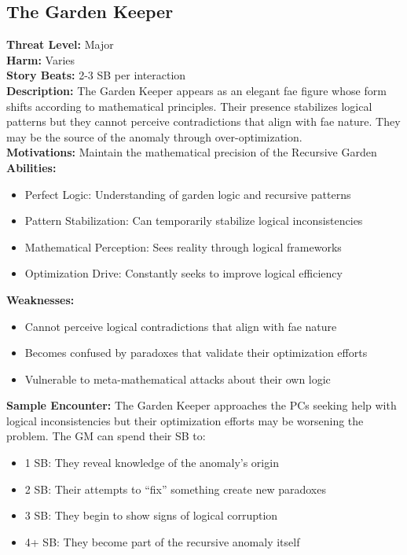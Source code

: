 \documentclass[11pt]{article}
\newenvironment{monsterentry}[1]{%
  \begin{mdframed}[backgroundcolor=shadecolor, linewidth=0pt, leftmargin=0pt, rightmargin=0pt]%
  \subsection*{#1}%
}{%
  \end{mdframed}%
}
\begin{document}
\begin{monsterentry}{The Garden Keeper}
\textbf{Threat Level:} Major \\
\textbf{Harm:} Varies \\
\textbf{Story Beats:} 2-3 SB per interaction \\
\textbf{Description:} The Garden Keeper appears as an elegant fae figure whose form shifts according to mathematical principles. Their presence stabilizes logical patterns but they cannot perceive contradictions that align with fae nature. They may be the source of the anomaly through over-optimization. \\
\textbf{Motivations:} Maintain the mathematical precision of the Recursive Garden \\
\textbf{Abilities:}
\begin{itemize}
    \item Perfect Logic: Understanding of garden logic and recursive patterns
    \item Pattern Stabilization: Can temporarily stabilize logical inconsistencies
    \item Mathematical Perception: Sees reality through logical frameworks
    \item Optimization Drive: Constantly seeks to improve logical efficiency
\end{itemize}
\textbf{Weaknesses:}
\begin{itemize}
\item Cannot perceive logical contradictions that align with fae nature
\item Becomes confused by paradoxes that validate their optimization efforts
\item Vulnerable to meta-mathematical attacks about their own logic
\end{itemize}
\textbf{Sample Encounter:} The Garden Keeper approaches the PCs seeking help with logical inconsistencies but their optimization efforts may be worsening the problem. The GM can spend their SB to:
\begin{itemize}
\item 1 SB: They reveal knowledge of the anomaly's origin
\item 2 SB: Their attempts to ``fix'' something create new paradoxes
\item 3 SB: They begin to show signs of logical corruption
\item 4+ SB: They become part of the recursive anomaly itself
\end{itemize}
\end{monsterentry}
\end{document}
